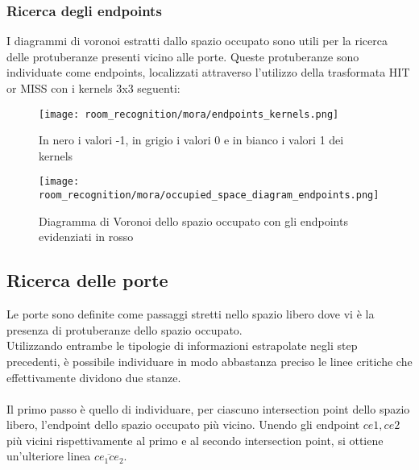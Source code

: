\subsubsection{Ricerca degli endpoints}
I diagrammi di voronoi estratti dallo spazio occupato sono utili per la ricerca delle protuberanze presenti vicino alle porte. Queste protuberanze sono individuate come endpoints, localizzati attraverso l'utilizzo della trasformata HIT or MISS con i kernels 3x3 seguenti:
\begin{figure}[H]
  \centering
  \texttt{[image: room\_recognition/mora/endpoints\_kernels.png]}
  \caption{In nero i valori -1, in grigio i valori 0 e in bianco i valori 1 dei kernels}
\end{figure}
\begin{figure}[H]
  \centering
  \texttt{[image: room\_recognition/mora/occupied\_space\_diagram\_endpoints.png]}
  \caption{Diagramma di Voronoi dello spazio occupato con gli endpoints evidenziati in rosso}
\end{figure}
\subsection{Ricerca delle porte}
Le porte sono definite come passaggi stretti nello spazio libero dove vi è la presenza di protuberanze dello spazio occupato.\\
Utilizzando entrambe le tipologie di informazioni estrapolate negli step precedenti, è possibile individuare in modo abbastanza preciso le linee critiche che effettivamente dividono due stanze. \\\\
Il primo passo è quello di individuare, per ciascuno intersection point dello spazio libero, l'endpoint dello spazio occupato più vicino. Unendo gli endpoint $ce1, ce2$ più vicini rispettivamente al primo e al secondo intersection point, si ottiene un'ulteriore linea $\overline{ce_1ce_2}$.\\

